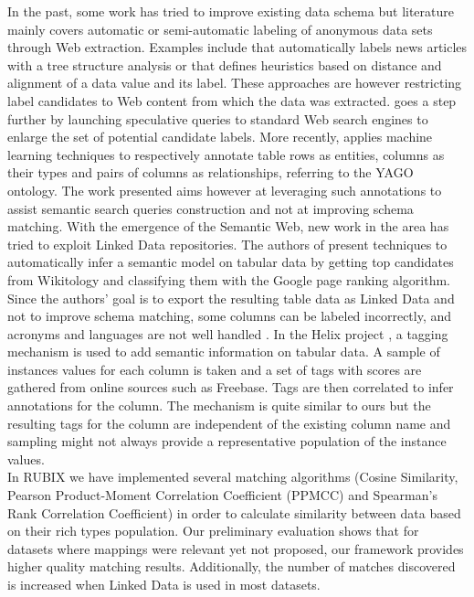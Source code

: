 \documentclass[onecolumn, crcready]{iosart2c}
\begin{document}
In the past, some work has tried to improve existing data schema \cite{DBLP:journals/debu/MillerA03} but literature mainly covers automatic or semi-automatic labeling of anonymous data sets through Web extraction. Examples include \cite{cas04} that automatically labels news articles with a tree structure analysis or \cite{wang2003extraction} that defines heuristics based on distance and alignment of a data value and its label. These approaches are however restricting label candidates to Web content from which the data was extracted. \cite{DBLP:conf/otm/SilvaBCS07} goes a step further by launching speculative queries to standard Web search engines to enlarge the set of potential candidate labels. More recently, \cite{Limaye:2010:ASW:1920841.1921005} applies machine learning techniques to respectively annotate table rows as entities, columns as their types and pairs of columns as relationships, referring to the YAGO ontology. The work presented aims however at leveraging such annotations to assist semantic search queries construction and not at improving schema matching.
With the emergence of the Semantic Web, new work in the area has tried to exploit Linked Data repositories. The authors of \cite{Syed2010Tables} present techniques to automatically infer a semantic model on tabular data by getting top candidates from Wikitology \cite{conf/aaaiss/FininSMMP09} and classifying them with the Google page ranking algorithm. Since the authors' goal is to export the resulting table data as Linked Data and not to improve schema matching, some columns can be labeled incorrectly, and acronyms and languages are not well handled \cite{Syed2010Tables}. In the Helix project \cite{conf/www/HassanzadehDFKSW11}, a tagging mechanism is used to add semantic information on tabular data. A sample of instances values for each column is taken and a set of tags with scores are gathered from online sources such as Freebase. Tags are then correlated to infer annotations for the column. The mechanism is quite similar to ours but the resulting tags for the column are independent of the existing column name and sampling might not always provide a representative population of the instance values.\\

In RUBIX we have implemented several matching algorithms (Cosine Similarity, Pearson Product-Moment Correlation Coefficient (PPMCC) and Spearman's Rank Correlation Coefficient) in order to calculate similarity between data based on their rich types population. Our preliminary evaluation shows that for datasets where mappings were relevant yet not proposed, our framework provides higher quality matching results. Additionally, the number of matches discovered is increased when Linked Data is used in most datasets.
\end{document}
